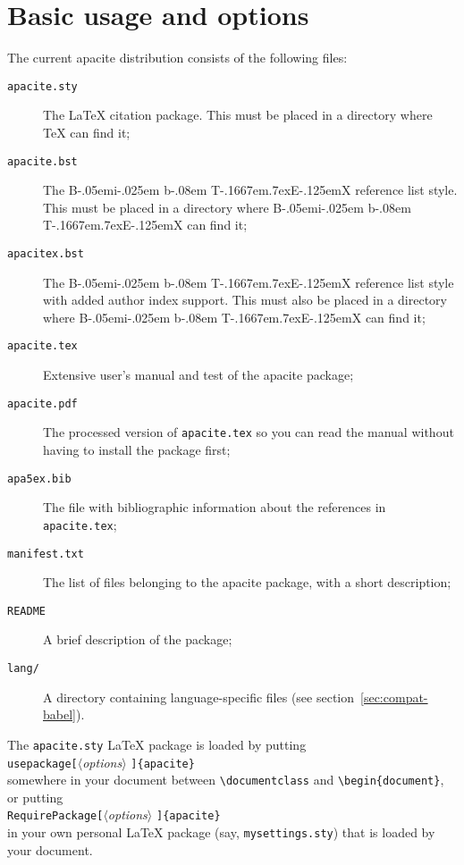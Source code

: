 \documentclass{article}
\makeatletter
\def\BibTeX{{\rm B\kern-.05em{\sc i\kern-.025em b}\kern-.08em
    T\kern-.1667em\lower.7ex\hbox{E}\kern-.125emX}}%
\newcommand{\pkg}[1]{\textsf{#1}}%
\newcommand{\fname}[1]{\texttt{#1}}%
\newcommand{\bs}{{\ttfamily \@backslashchar}}%
\newcommand{\opt}[1]{$\langle${\itshape #1}$\rangle$}%
\newcommand{\cmdthreealt}[3]{{\mdseries\bs\texttt{#1[}\opt{#2}%
                        \texttt{]\{#3\}}}}%
\makeatother
\begin{document}
\section{Basic usage and options}
\label{sec:usage}
The current \pkg{apacite} distribution consists of the following files:
\begin{description}
\item[\fname{apacite.sty}] The \LaTeX{} citation package. This must
  be placed in a directory where \TeX{} can find it;
\item[\fname{apacite.bst}] The \BibTeX{} reference list style. This
  must be placed in a directory where \BibTeX{} can find it;
\item[\fname{apacitex.bst}] The \BibTeX{} reference list style with
  added author index support. This must also be placed in a directory
  where \BibTeX{} can find it;
\item[\fname{apacite.tex}] Extensive user's manual and test of the
  \pkg{apacite} package;
\item[\fname{apacite.pdf}] The processed version of \fname{apacite.tex}
  so you can read the manual without having to install the package first;
\item[\fname{apa5ex.bib}] The file with bibliographic information
  about the references in \fname{apacite.tex};
\item[\fname{manifest.txt}] The list of files belonging to the \pkg{apacite}
  package, with a short description;
\item[\fname{README}] A brief description of the package;
\item[\fname{lang/}] A directory containing language-specific files
  (see section~\ref{sec:compat-babel}).
\end{description}
The \fname{apacite.sty} \LaTeX{} package is loaded by putting
\mbox{}\vspace{0.7\baselineskip}\\
\cmdthreealt{usepackage}{options}{apacite}
\mbox{}\vspace{0.7\baselineskip}\\
somewhere in your document between \verb+\documentclass+ and
\verb+\begin{document}+, or putting
\mbox{}\vspace{0.7\baselineskip}\\
\cmdthreealt{RequirePackage}{options}{apacite}
\mbox{}\vspace{0.7\baselineskip}\\
in your own personal \LaTeX{} package (say, \fname{mysettings.sty})
that is loaded by your document.
\end{document}

